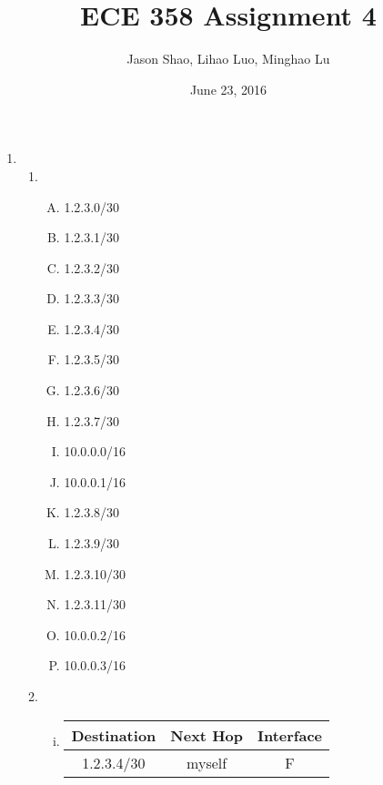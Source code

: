 \documentclass[12pt]{article}
\title{ECE 358 Assignment 4}
\author{Jason Shao, Lihao Luo, Minghao Lu}
\date{June 23, 2016}
\begin{document}
\maketitle
\renewcommand{\thesubsection}{Problem \arabic{subsection}}


\def\question#1{\item[\bf #1.]}
\def\part#1{\item[\bf #1)]}
\newcommand{\pc}[1]{\mbox{\textbf{#1}}} %

\begin{enumerate}
	 \item \begin{enumerate}
        \item \begin{enumerate}[(A)]
            \item 1.2.3.0/30
            \item 1.2.3.1/30
            \item 1.2.3.2/30
            \item 1.2.3.3/30
            \item 1.2.3.4/30
            \item 1.2.3.5/30
            \item 1.2.3.6/30
            \item 1.2.3.7/30
            \item 10.0.0.0/16
            \item 10.0.0.1/16
            \item 1.2.3.8/30
            \item 1.2.3.9/30
            \item 1.2.3.10/30
            \item 1.2.3.11/30
            \item 10.0.0.2/16
            \item 10.0.0.3/16
        \end{enumerate}
    \item \begin{enumerate}[(i)]
        \item
            \begin{tabular}{ |c|c|c| } 
             \hline
             Destination & Next Hop & Interface \\ 
             \hline
             1.2.3.4/30 & myself & F \\
             \hline

\end{tabular}
\end{enumerate}
\end{enumerate}
\end{enumerate}
\end{document}
